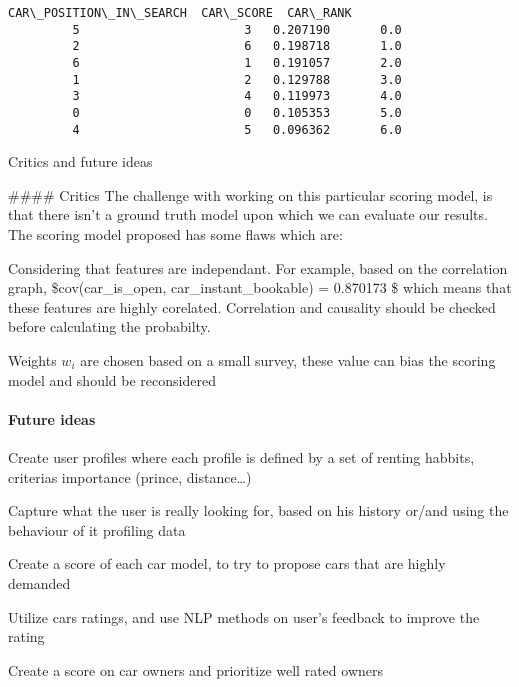\documentclass[11pt]{article}
\begin{document}
\begin{Verbatim}[commandchars=\\\{\}]
            CAR\_POSITION\_IN\_SEARCH  CAR\_SCORE  CAR\_RANK  
         5                       3   0.207190       0.0  
         2                       6   0.198718       1.0  
         6                       1   0.191057       2.0  
         1                       2   0.129788       3.0  
         3                       4   0.119973       4.0  
         0                       0   0.105353       5.0  
         4                       5   0.096362       6.0  
\end{Verbatim}
            
    Critics and future ideas

 \#\#\#\# Critics The challenge with working on this particular scoring
model, is that there isn't a ground truth model upon which we can
evaluate our results. The scoring model proposed has some flaws which
are:

Considering that features are independant. For example, based on the
correlation graph, \$cov(car\_is\_open, car\_instant\_bookable) =
0.870173 \$ which means that these features are highly corelated.
Correlation and causality should be checked before calculating the
probabilty.

Weights \(w_i\) are chosen based on a small survey, these value can bias
the scoring model and should be reconsidered

\hypertarget{future-ideas}{%
\paragraph{Future ideas}\label{future-ideas}}

Create user profiles where each profile is defined by a set of renting
habbits, criterias importance (prince, distance\ldots{})

Capture what the user is really looking for, based on his history or/and
using the behaviour of it profiling data

Create a score of each car model, to try to propose cars that are highly
demanded

Utilize cars ratings, and use NLP methods on user's feedback to improve
the rating

Create a score on car owners and prioritize well rated owners


    
    
    
    
\end{document}
